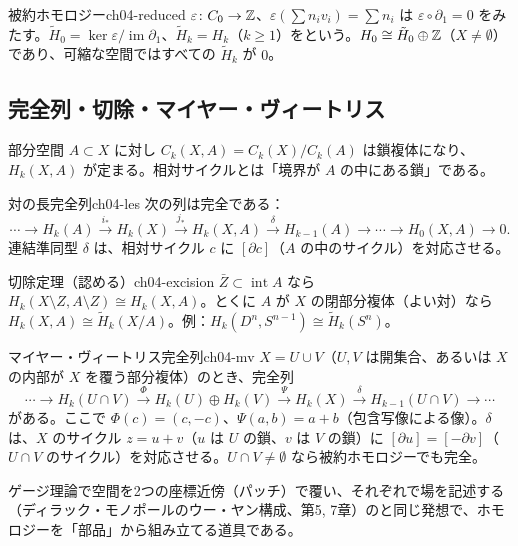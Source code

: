 \begin{mydef}{被約ホモロジー}{ch04-reduced}
 $\varepsilon\colon C_0\to\mathbb{Z}$、$\varepsilon(\sum n_iv_i)=\sum n_i$ は $\varepsilon\circ\partial_1=0$ をみたす。$\tilde H_0=\ker\varepsilon/\operatorname{im}\partial_1$、$\tilde H_k=H_k$（$k\ge1$）をという。$H_0\cong\tilde H_0\oplus\mathbb{Z}$（$X\ne\emptyset$）であり、可縮な空間ではすべての $\tilde H_k$ が $0$。
\end{mydef}

\subsection{完全列・切除・マイヤー・ヴィートリス}

部分空間 $A\subset X$ に対し $C_k(X,A)=C_k(X)/C_k(A)$ は鎖複体になり、 $H_k(X,A)$ が定まる。相対サイクルとは「境界が $A$ の中にある鎖」である。

\begin{mythm}{対の長完全列}{ch04-les}
次の列は完全である：
\[
\cdots\to H_k(A)\xrightarrow{i_*}H_k(X)\xrightarrow{j_*}H_k(X,A)\xrightarrow{\ \delta\ }H_{k-1}(A)\to\cdots\to H_0(X,A)\to0 .
\]
連結準同型 $\delta$ は、相対サイクル $c$ に $[\partial c]$（$A$ の中のサイクル）を対応させる。
\end{mythm}

\begin{mythm}{切除定理（認める）}{ch04-excision}
$\bar Z\subset\operatorname{int}A$ なら $H_k(X\setminus Z,A\setminus Z)\cong H_k(X,A)$。とくに $A$ が $X$ の閉部分複体（よい対）なら $H_k(X,A)\cong\tilde H_k(X/A)$。例：$H_k(D^n,S^{n-1})\cong\tilde H_k(S^n)$。
\end{mythm}

\begin{mythm}{マイヤー・ヴィートリス完全列}{ch04-mv}
$X=U\cup V$（$U,V$ は開集合、あるいは $X$ の内部が $X$ を覆う部分複体）のとき、完全列
\[
\cdots\to H_k(U\cap V)\xrightarrow{\ \Phi\ }H_k(U)\oplus H_k(V)\xrightarrow{\ \Psi\ }H_k(X)\xrightarrow{\ \delta\ }H_{k-1}(U\cap V)\to\cdots
\]
がある。ここで $\Phi(c)=(c,-c)$、$\Psi(a,b)=a+b$（包含写像による像）。$\delta$ は、$X$ のサイクル $z=u+v$（$u$ は $U$ の鎖、$v$ は $V$ の鎖）に $[\partial u]=[-\partial v]$（$U\cap V$ のサイクル）を対応させる。$U\cap V\ne\emptyset$ なら被約ホモロジーでも完全。
\end{mythm}
ゲージ理論で空間を2つの座標近傍（パッチ）で覆い、それぞれで場を記述する（ディラック・モノポールのウー・ヤン構成、第5, 7章）のと同じ発想で、ホモロジーを「部品」から組み立てる道具である。

